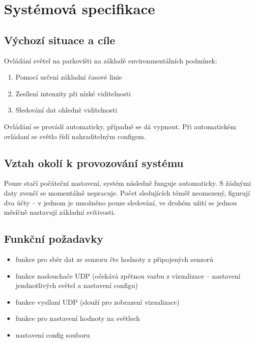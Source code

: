 \chapter{Systémová specifikace}

\section{Výchozí situace a cíle}

Ovládání světel na parkovišti na základě environmentálních podmínek:
\begin{enumerate}
    \item Pomocí určení základní časové linie
    \item Zesílení intenzity při nízké viditelnosti
    \item Sledování dat ohledně viditelnosti
\end{enumerate}

Ovládání se provádí automaticky, případně se dá vypnout. Při automatickém ovládaní se světlo řídí nahraditelným configem.


\section{Vztah okolí k provozování systému}

Pouze stačí počáteční nastavení, systém následně funguje automaticky. S žádnými daty zvenčí se momentálně nepracuje.
Počet sledujících téměř neomezený, figurují dva účty -- v jednom je umožněno pouze sledování, ve druhém užití se jednou měsíčně nastavují základní svítivosti.


\section{Funkční požadavky} 

\begin{itemize}
    \item funkce pro sběr dat ze senzoru čte hodnoty z připojených senzorů
    \item funkce naslouchače UDP (očekává zpětnou vazbu z vizualizace -- nastavení jendnotlivých světel a nastavení configu)
    \item funkce vysílaní UDP (slouží pro zobrazení vizualizace)
    \item funkce pro nastavení hodnoty na světlech
    \item nastavení config souboru
\end{itemize}

